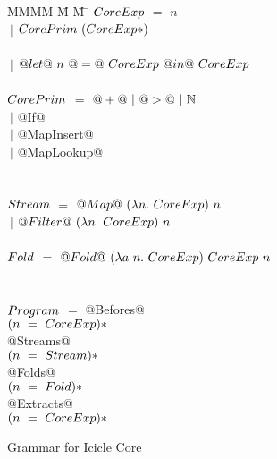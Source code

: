 
\begin{figure}

\begin{tabbing}
MMMM \= M \= M \= \kill
$\mit{CoreExp}$
    \> $=$  \> $n$          \\
    \> $~|$ \> $\mit{CorePrim}~(\mit{CoreExp}*)$ \\
\\
    \> $~|$ \> $@let@~n~@=@~\mit{CoreExp}~@in@~\mit{CoreExp}$ \\
\\
$\mit{CorePrim}$
    \> $=$  \> $@+@~|~@>@~|~\mathbb{N}$ \\
    \> $~|$ \> @If@ \\
    \> $~|$ \> @MapInsert@ \\
    \> $~|$ \> @MapLookup@ \\
\\
\\
$\mit{Stream}$
    \> $=$  \> $@Map@~(\lambda{}n.~\mit{CoreExp})~n$ \\
    \> $~|$ \> $@Filter@~(\lambda{}n.~\mit{CoreExp})~n$ \\
\\
$\mit{Fold}$
    \> $=$  \> $@Fold@~(\lambda{}a~n.~\mit{CoreExp})~\mit{CoreExp}~n$ \\
\\
\\
$\mit{Program}$
    \> $=$  \> @Befores@ \\
    \>      \> \> $(n~=~\mit{CoreExp})*$ \\
    \>      \> @Streams@ \\
    \>      \> \> $(n~=~\mit{Stream})*$ \\
    \>      \> @Folds@ \\
    \>      \> \> $(n~=~\mit{Fold})*$ \\
    \>      \> @Extracts@ \\
    \>      \> \> $(n~=~\mit{CoreExp})*$ \\
\end{tabbing}


\caption{Grammar for Icicle Core}
\label{fig:core:grammar}
\end{figure}


